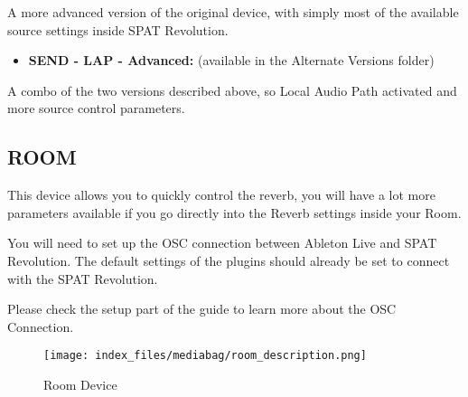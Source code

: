 \documentclass[
  letterpaper,
  DIV=11,
  numbers=noendperiod]{scrreport}
\providecommand{\tightlist}{%
  \setlength{\itemsep}{0pt}\setlength{\parskip}{0pt}}\usepackage{longtable,booktabs,array}
\begin{document}
A more advanced version of the original device, with simply most of the
available source settings inside SPAT Revolution.

\begin{itemize}
\tightlist
\item
  \textbf{SEND - LAP - Advanced:} (available in the Alternate Versions
  folder)
\end{itemize}

A combo of the two versions described above, so Local Audio Path
activated and more source control parameters.

\hypertarget{room-2}{%
\subsection{ROOM}\label{room-2}}

This device allows you to quickly control the reverb, you will have a
lot more parameters available if you go directly into the Reverb
settings inside your Room.

You will need to set up the OSC connection between Ableton Live and SPAT
Revolution. The default settings of the plugins should already be set to
connect with the SPAT Revolution.

Please check the setup part of the guide to learn more about the OSC
Connection.

\begin{figure}

{\centering \texttt{[image: index\_files/mediabag/room\_description.png]}

}

\caption{Room Device}

\end{figure}
\end{document}
